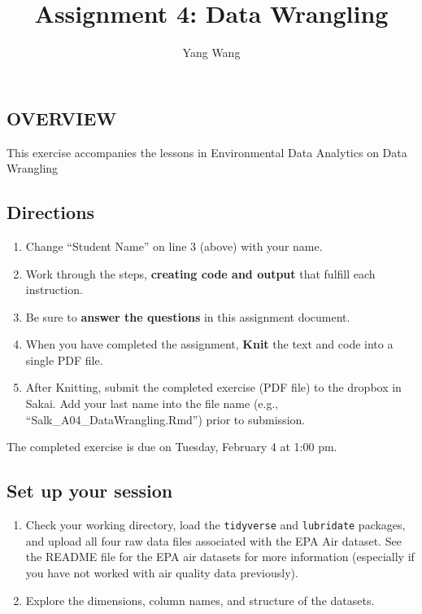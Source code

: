 \documentclass[]{article}
\title{Assignment 4: Data Wrangling}
\author{Yang Wang}
\date{}
\providecommand{\tightlist}{%
  \setlength{\itemsep}{0pt}\setlength{\parskip}{0pt}}
\begin{document}
\maketitle

\hypertarget{overview}{%
\subsection{OVERVIEW}\label{overview}}

This exercise accompanies the lessons in Environmental Data Analytics on
Data Wrangling

\hypertarget{directions}{%
\subsection{Directions}\label{directions}}

\begin{enumerate}
\def\labelenumi{\arabic{enumi}.}
\tightlist
\item
  Change ``Student Name'' on line 3 (above) with your name.
\item
  Work through the steps, \textbf{creating code and output} that fulfill
  each instruction.
\item
  Be sure to \textbf{answer the questions} in this assignment document.
\item
  When you have completed the assignment, \textbf{Knit} the text and
  code into a single PDF file.
\item
  After Knitting, submit the completed exercise (PDF file) to the
  dropbox in Sakai. Add your last name into the file name (e.g.,
  ``Salk\_A04\_DataWrangling.Rmd'') prior to submission.
\end{enumerate}

The completed exercise is due on Tuesday, February 4 at 1:00 pm.

\hypertarget{set-up-your-session}{%
\subsection{Set up your session}\label{set-up-your-session}}

\begin{enumerate}
\def\labelenumi{\arabic{enumi}.}
\item
  Check your working directory, load the \texttt{tidyverse} and
  \texttt{lubridate} packages, and upload all four raw data files
  associated with the EPA Air dataset. See the README file for the EPA
  air datasets for more information (especially if you have not worked
  with air quality data previously).
\item
  Explore the dimensions, column names, and structure of the datasets.
\end{enumerate}
\end{document}
